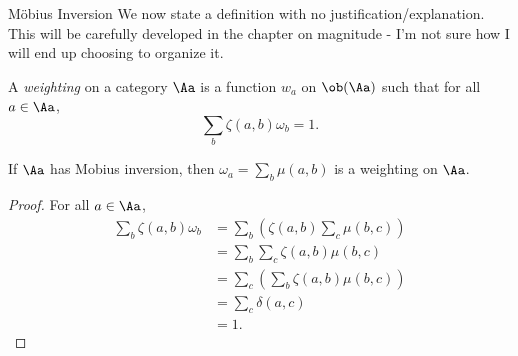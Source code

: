 \documentclass[12pt]{pom_thesis}
\begin{document}
\begin{chapter}{M\"obius Inversion}
We now state a definition with no justification/explanation. This will be carefully developed in the chapter on magnitude - I'm not sure how I will end up choosing to organize it.
\begin{defn}
A \emph{weighting} on a category $\Aa$ is a function $w_a$ on $\ob(\Aa)$ such that for all $a \in \Aa$,
\[
\sum_b \zeta(a,b)\omega_b = 1.
\]
\end{defn}
\begin{lemma}
\label{mobius_is_weighting}
If $\Aa$ has Mobius inversion, then $\omega_a = \sum_b \mu(a,b)$ is a weighting on $\Aa$.
\end{lemma}
\begin{proof} For all $a \in \Aa$,
\begin{align*}
\sum_b \zeta(a,b)\omega_b &= \sum_b\left( \zeta(a,b)\sum_c \mu(b,c)\right)\\
&=\sum_b\sum_c\zeta(a,b)\mu(b,c)\\
&=\sum_c\left(\sum_b\zeta(a,b)\mu(b,c)\right)\\
&=\sum_c \delta(a,c)\\
&=1.
\end{align*}
\end{proof}


\end{chapter}
\end{document}

